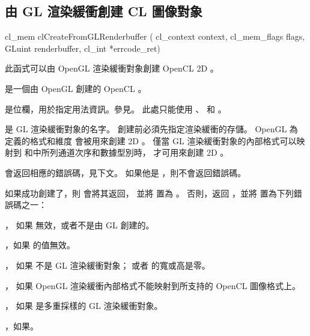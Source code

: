 \subsection{由 GL 渲染緩衝創建 CL 圖像對象}


\startCLFUNC
cl_mem clCreateFromGLRenderbuffer (
			cl_context context,
			cl_mem_flags flags,
			GLuint renderbuffer,
			cl_int *errcode_ret)
\stopCLFUNC

此函式可以由 OpenGL 渲染緩衝對象創建 OpenCL 2D 。

 是一個由 OpenGL 創建的 OpenCL 。

 是位欄，用於指定用法資訊。參見。
此處只能使用 、  和 。

 是 GL 渲染緩衝對象的名字。
創建前必須先指定渲染緩衝的存儲。
OpenGL 為  定義的格式和維度
會被用來創建 2D 。
僅當 GL 渲染緩衝對象的內部格式可以映射到
和中所列通道次序和數據型別時，
才可用來創建 2D 。

 會返回相應的錯誤碼，見下文。
如果他是 ，則不會返回錯誤碼。

如果成功創建了，則  會將其返回，
並將  置為 。
否則，返回 ，並將  置為下列錯誤碼之一：
\startigBase
\item {}，
如果  無效，或者不是由 GL 創建的。

\item {}，如果  的值無效。

\item {}，
如果  不是 GL 渲染緩衝對象；
或者  的寬或高是零。

\item {}，
如果 OpenGL 渲染緩衝內部格式不能映射到所支持的 OpenCL 圖像格式上。

\item {}，
如果  是多重採樣的 GL 渲染緩衝對象。

\item {}，如果\scdevfailres。

